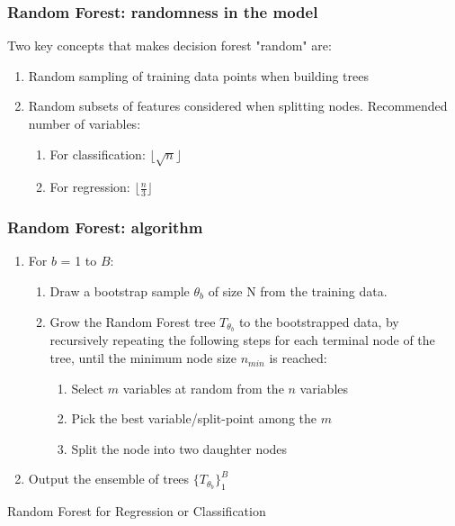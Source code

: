 \begin{frame}
\frametitle{Random Forest: randomness in the model}

Two key concepts that makes decision forest "random" are:
\vspace{1ex}
\begin{enumerate}
	\item Random sampling of training data points when building trees
\vspace{1ex}
	\item Random subsets of features considered when splitting nodes. Recommended number of variables:
\vspace{1ex}
	\begin{enumerate}[a]
	    \item For classification:  $\lfloor{\sqrt{n}} \rfloor$
\vspace{1ex}
	    \item For regression: $\lfloor \frac{n}{3} \rfloor$
	\end{enumerate}
\end{enumerate}


\end{frame}

\begin{frame}
\frametitle{Random Forest: algorithm}

\begin{algorithm}[H]
\SetAlgoLined
\begin{enumerate}
	\item For $b$ = 1 to $B$:
	\begin{enumerate}[a]
	    \item Draw a bootstrap sample $\theta_{b}$ of size N from the training data.
	    \item Grow the Random Forest tree ${{T}_{\theta_{b}}}$ to the bootstrapped data, by recursively repeating the following steps for each terminal node of the tree, until the minimum node size $n_{min}$ is reached:
	    \begin{enumerate}[i]
	       \item Select $m$ variables at random from the $n$ variables
	       \item Pick the best variable/split-point among the $m$
	       \item  Split the node into two daughter nodes
	    \end{enumerate}
	\end{enumerate}
	\item  Output the ensemble of trees $\{{T}_{\theta_{b}}\}_{1}^{B}$
\end{enumerate}
 \caption{Random Forest for Regression or Classification}
\end{algorithm}

\end{frame}















